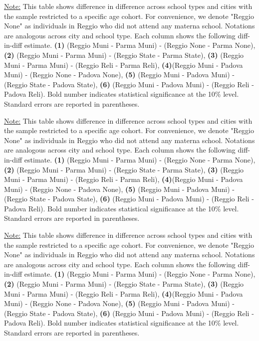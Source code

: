 \documentclass[11pt]{article}
\newcommand{\fnDID}{\underline{Note:} This table shows difference in difference across school types and cities with the sample restricted to a specific age cohort. For convenience, we denote "Reggio None" as individuals in Reggio who did not attend any materna school. Notations are analogous across city and school type. Each column shows the following diff-in-diff estimate. \textbf{(1)} (Reggio Muni - Parma Muni) - (Reggio None - Parma None), \textbf{(2)} (Reggio Muni - Parma Muni) - (Reggio State - Parma State), \textbf{(3)} (Reggio Muni - Parma Muni) - (Reggio Reli - Parma Reli), \textbf{(4)}(Reggio Muni - Padova Muni) - (Reggio None - Padova None),  \textbf{(5)}  (Reggio Muni - Padova Muni) - (Reggio State - Padova State), \textbf{(6)}  (Reggio Muni - Padova Muni) - (Reggio Reli - Padova Reli). Bold number indicates statistical significance at the 10\% level. Standard errors are reported in parentheses.}
\begin{document}
\begin{table}[H]
\begin{center}
	\caption{Difference-in-Difference Across School Types and Cities, Restricting to Age-30 Cohort} \label{table:NCh-30}
	\scalebox{0.80}{
		}
\end{center}
\footnotesize
\fnDID
\end{table}

\begin{table}[H]
\begin{center}
	\caption{Difference-in-Difference Across School Types and Cities, Restricting to Age-40 Cohort} \label{table:NCh-40}
	\scalebox{0.80}{
		}
\end{center}
\footnotesize
\fnDID
\end{table}

\begin{table}[H]
\begin{center}
	\caption{Difference-in-Difference Across School Types and Cities, Restricting to Age-50 Cohort} \label{table:NCh-50}
	\scalebox{0.80}{
		}
\end{center}
\footnotesize
\fnDID
\end{table}
\end{document}
